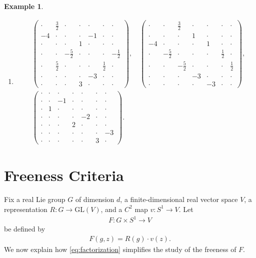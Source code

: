 \documentclass[a4paper,10pt,leqno]{article}
\numberwithin{equation}{section}
\theoremstyle{plain}
\theoremstyle{definition}
\newtheorem{ex}[thm]{Example}
\theoremstyle{remark}
\newcommand{\GL}{\mathrm{GL}}
\newcommand{\mat}[1]{\begin{matrix}#1\end{matrix}}
\newcommand{\pmat}[1]{\left(\mat{#1}\right)}
\begin{document}
\begin{ex}
\begin{enumerate}
\item[$\ell = 3$:]
\begin{align}
&\pmat{\cdot&\frac{3}{2}&\cdot&\cdot&\cdot&\cdot&\cdot\\
	-4&\cdot&\cdot&\cdot&-1&\cdot&\cdot\\ 
	\cdot&\cdot&\cdot&1&\cdot&\cdot&\cdot\\ \cdot&\cdot&-\frac{5}{2}&\cdot&\cdot&\cdot&-\frac{1}{2}\\ \cdot&\frac{5}{2}&\cdot&\cdot&\cdot&\frac{1}{2}&\cdot\\ \cdot&\cdot&\cdot&\cdot&-3&\cdot&\cdot\\ \cdot&\cdot&\cdot&3&\cdot&\cdot&\cdot},\quad 
\pmat{\cdot&\cdot&\frac{3}{2}&\cdot&\cdot&\cdot&\cdot\\
	\cdot&\cdot&\cdot&1&\cdot&\cdot&\cdot\\
	-4&\cdot&\cdot&\cdot&1&\cdot&\cdot\\ \cdot&-\frac{5}{2}&\cdot&\cdot&\cdot&\frac{1}{2}&\cdot\\ \cdot&\cdot&-\frac{5}{2}&\cdot&\cdot&\cdot&\frac{1}{2}\\ \cdot&\cdot&\cdot&-3&\cdot&\cdot&\cdot\\
	\cdot&\cdot&\cdot&\cdot&-3&\cdot&\cdot},\\[0.5ex]
&\pmat{\cdot&\cdot&\cdot&\cdot&\cdot&\cdot&\cdot\\
	\cdot&\cdot&-1&\cdot&\cdot&\cdot&\cdot\\ \cdot&1&\cdot&\cdot&\cdot&\cdot&\cdot\\ \cdot&\cdot&\cdot&\cdot&-2&\cdot&\cdot\\ \cdot&\cdot&\cdot&2&\cdot&\cdot&\cdot\\ \cdot&\cdot&\cdot&\cdot&\cdot&\cdot&-3\\ \cdot&\cdot&\cdot&\cdot&\cdot&3&\cdot}.
\end{align}

\end{enumerate}
\end{ex}

\section{Freeness Criteria}

Fix a real Lie group $G$ of dimension $d$, a finite-dimensional real vector space $V$, a representation $R \colon G \to \GL(V)$, and a $C^2$ map $v \colon S^1 \to V$.
Let
\begin{align} 
F \colon G \times S^1 \to V
\end{align}
be defined by 
\begin{align}\label{eq:factorization}
F(g, z) = R(g) \cdot v(z).
\end{align}
We now explain how \eqref{eq:factorization} simplifies the study of the freeness of $F$.
\end{document}
